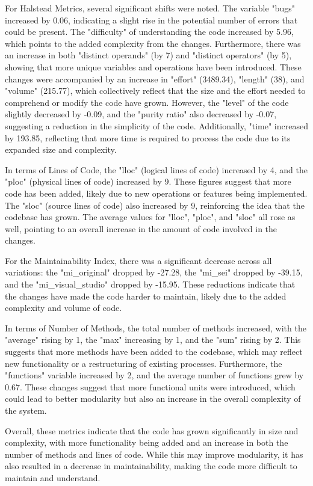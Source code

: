 For Halstead Metrics, several significant shifts were noted. The variable "bugs" increased by 0.06, indicating a slight rise in the potential number of errors that could be present. The "difficulty" of understanding the code increased by 5.96, which points to the added complexity from the changes. Furthermore, there was an increase in both "distinct operands" (by 7) and "distinct operators" (by 5), showing that more unique variables and operations have been introduced. These changes were accompanied by an increase in "effort" (3489.34), "length" (38), and "volume" (215.77), which collectively reflect that the size and the effort needed to comprehend or modify the code have grown. However, the "level" of the code slightly decreased by -0.09, and the "purity ratio" also decreased by -0.07, suggesting a reduction in the simplicity of the code. Additionally, "time" increased by 193.85, reflecting that more time is required to process the code due to its expanded size and complexity.

In terms of Lines of Code, the "lloc" (logical lines of code) increased by 4, and the "ploc" (physical lines of code) increased by 9. These figures suggest that more code has been added, likely due to new operations or features being implemented. The "sloc" (source lines of code) also increased by 9, reinforcing the idea that the codebase has grown. The average values for "lloc", "ploc", and "sloc" all rose as well, pointing to an overall increase in the amount of code involved in the changes.

For the Maintainability Index, there was a significant decrease across all variations: the "mi\_original" dropped by -27.28, the "mi\_sei" dropped by -39.15, and the "mi\_visual\_studio" dropped by -15.95. These reductions indicate that the changes have made the code harder to maintain, likely due to the added complexity and volume of code.

In terms of Number of Methods, the total number of methods increased, with the "average" rising by 1, the "max" increasing by 1, and the "sum" rising by 2. This suggests that more methods have been added to the codebase, which may reflect new functionality or a restructuring of existing processes. Furthermore, the "functions" variable increased by 2, and the average number of functions grew by 0.67. These changes suggest that more functional units were introduced, which could lead to better modularity but also an increase in the overall complexity of the system.

Overall, these metrics indicate that the code has grown significantly in size and complexity, with more functionality being added and an increase in both the number of methods and lines of code. While this may improve modularity, it has also resulted in a decrease in maintainability, making the code more difficult to maintain and understand.
